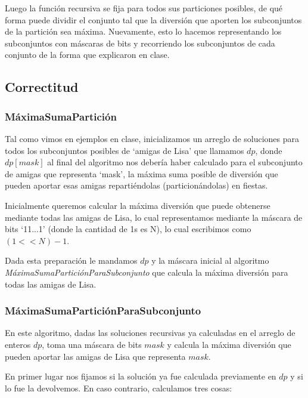 Luego la función recursiva se fija para todos sus particiones
posibles, de qué forma puede dividir el conjunto tal que la diversión que
aporten los subconjuntos de la partición sea máxima. Nuevamente, esto lo hacemos
representando los subconjuntos con máscaras de bits y recorriendo los
subconjuntos de cada conjunto de la forma que explicaron en clase.

\subsection{Correctitud}

\subsubsection*{MáximaSumaPartición}
Tal como vimos en ejemplos en clase, inicializamos un arreglo de soluciones para
todos los subconjuntos posibles de `amigas de Lisa' que llamamos $dp$, donde
$dp[mask]$ al final del algoritmo nos debería haber calculado para el
subconjunto de amigas que representa `mask', la máxima suma posible de diversión
que pueden aportar esas amigas repartiéndolas (particionándolas) en fiestas.

Inicialmente queremos calcular la máxima diversión que puede obtenerse mediante
todas las amigas de Lisa, lo cual representamos mediante la máscara de bits
`11...1' (donde la cantidad de 1s es N), lo cual escribimos como $(1<<N)-1$.

Dada esta preparación le mandamos $dp$ y la máscara inicial al algoritmo
\emph{MáximaSumaParticiónParaSubconjunto} que calcula la máxima diversión para todas
las amigas de Lisa.

\subsubsection*{MáximaSumaParticiónParaSubconjunto}

En este algoritmo, dadas las soluciones recursivas ya calculadas en el arreglo
de enteros $dp$, toma una máscara de bits $mask$ y calcula la máxima diversión
que pueden aportar las amigas de Lisa que representa $mask$.

En primer lugar nos fijamos si la solución ya fue calculada previamente en $dp$
y si lo fue la devolvemos. En caso contrario, calculamos tres cosas:

